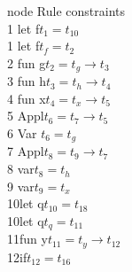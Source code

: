 \documentclass{article}
\begin{document}
\begin{multicols}{3}
\noindent
node\hspace{0.5cm} Rule \hspace{1cm}constraints\\
1 \hspace{1cm}let f\hspace{1.2cm}$t_1=t_{10}$\\
1 \hspace{1cm}let f\hspace{1.2cm}$t_f=t_2$\\
2 \hspace{1cm}fun g\hspace{1cm}$t_2=t_g\rightarrow t_3$\\
3 \hspace{1cm}fun h\hspace{1cm}$t_3 = t_h \rightarrow t_4$\\
4 \hspace{1cm}fun x\hspace{1cm}$t_4 = t_x \rightarrow t_5$\\
5 \hspace{1cm}Appl\hspace{1.05cm}$t_6 = t_7\rightarrow t_5$\\
6 \hspace{1cm}Var  \hspace{1.2cm}$t_6 = t_g$\\
7 \hspace{1cm}Appl\hspace{1.1cm}$t_8 = t_9 \rightarrow t_7$\\
8 \hspace{1cm}var\hspace{1.4cm}$t_8 = t_h$\\
9 \hspace{1cm}var\hspace{1.4cm}$t_9 = t_x$\\
10\hspace{1cm}let q\hspace{1.2cm}$t_{10} = t_{18}$\\
10\hspace{1cm}let q\hspace{1.2cm}$t_q = t_{11}$\\
11\hspace{1cm}fun y\hspace{1cm}$t_{11} = t_y \rightarrow t_{12}$\\
12\hspace{1cm}if\hspace{1.4cm}$t_{12} = t_{16}$\\

\end{multicols}
\end{document}
